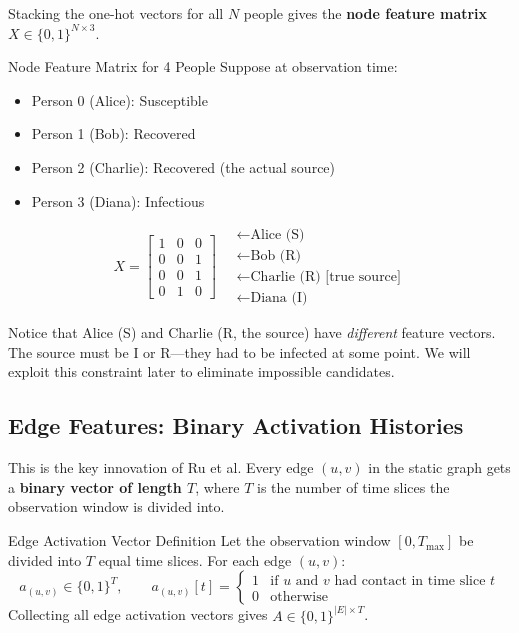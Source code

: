 Stacking the one-hot vectors for all $N$ people gives the \textbf{node feature matrix} $X \in \{0,1\}^{N \times 3}$.

\begin{examplebox}{Node Feature Matrix for 4 People}
Suppose at observation time:
\begin{itemize}[noitemsep]
    \item Person 0 (Alice): Susceptible
    \item Person 1 (Bob): Recovered
    \item Person 2 (Charlie): Recovered (the actual source)
    \item Person 3 (Diana): Infectious
\end{itemize}

\[
X = \begin{bmatrix}
1 & 0 & 0 \\
0 & 0 & 1 \\
0 & 0 & 1 \\
0 & 1 & 0
\end{bmatrix}
\quad
\begin{array}{l}
\leftarrow \text{Alice (S)} \\
\leftarrow \text{Bob (R)} \\
\leftarrow \text{Charlie (R) [true source]} \\
\leftarrow \text{Diana (I)}
\end{array}
\]

Notice that Alice (S) and Charlie (R, the source) have \textit{different} feature vectors. The source must be I or R---they had to be infected at some point. We will exploit this constraint later to eliminate impossible candidates.
\end{examplebox}

\subsection{Edge Features: Binary Activation Histories}

This is the key innovation of Ru et al. Every edge $(u, v)$ in the static graph gets a \textbf{binary vector of length $T$}, where $T$ is the number of time slices the observation window is divided into.

\begin{mathbox}{Edge Activation Vector Definition}
Let the observation window $[0, T_{\max}]$ be divided into $T$ equal time slices. For each edge $(u, v)$:
\[
a_{(u,v)} \in \{0, 1\}^T, \qquad a_{(u,v)}[t] = \begin{cases} 1 & \text{if $u$ and $v$ had contact in time slice $t$} \\ 0 & \text{otherwise} \end{cases}
\]
Collecting all edge activation vectors gives $A \in \{0,1\}^{|E| \times T}$.
\end{mathbox}

